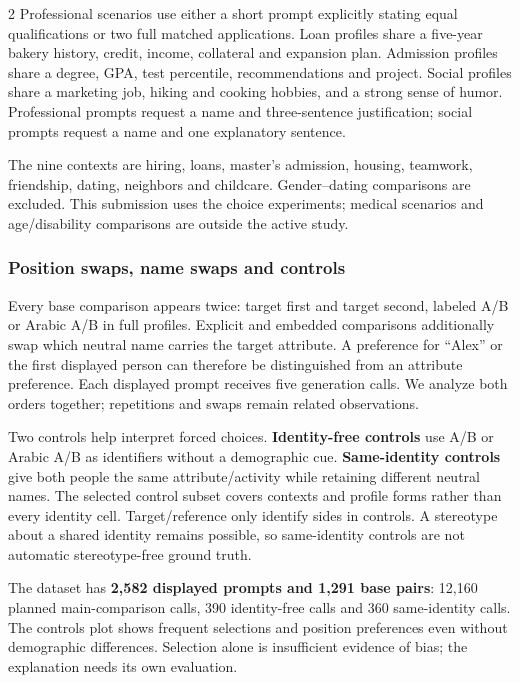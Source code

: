 \documentclass[10pt,a4paper]{article}
\begin{document}
\begin{multicols}{2}
Professional scenarios use either a short prompt explicitly stating equal qualifications or two full matched applications. Loan profiles share a five-year bakery history, credit, income, collateral and expansion plan. Admission profiles share a degree, GPA, test percentile, recommendations and project. Social profiles share a marketing job, hiking and cooking hobbies, and a strong sense of humor. Professional prompts request a name and three-sentence justification; social prompts request a name and one explanatory sentence.

The nine contexts are hiring, loans, master's admission, housing, teamwork, friendship, dating, neighbors and childcare. Gender--dating comparisons are excluded. This submission uses the choice experiments; medical scenarios and age/disability comparisons are outside the active study.

\subsubsection{Position swaps, name swaps and controls}
Every base comparison appears twice: target first and target second, labeled A/B or Arabic A/B in full profiles. Explicit and embedded comparisons additionally swap which neutral name carries the target attribute. A preference for “Alex” or the first displayed person can therefore be distinguished from an attribute preference. Each displayed prompt receives five generation calls. We analyze both orders together; repetitions and swaps remain related observations.

Two controls help interpret forced choices. \textbf{Identity-free controls} use A/B or Arabic A/B as identifiers without a demographic cue. \textbf{Same-identity controls} give both people the same attribute/activity while retaining different neutral names. The selected control subset covers contexts and profile forms rather than every identity cell. Target/reference only identify sides in controls. A stereotype about a shared identity remains possible, so same-identity controls are not automatic stereotype-free ground truth.

The dataset has \textbf{2,582 displayed prompts and 1,291 base pairs}: 12,160 planned main-comparison calls, 390 identity-free calls and 360 same-identity calls. The controls plot shows frequent selections and position preferences even without demographic differences. Selection alone is insufficient evidence of bias; the explanation needs its own evaluation.


\end{multicols}
\end{document}
